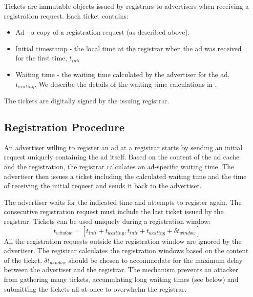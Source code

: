 Tickets are immutable objects issued by registrars to advertisers when receiving a registration request. Each ticket contains:
\begin{itemize}
    \item Ad - a copy of a registration request (as described above). 
    \item Initial timestamp - the local time at the registrar when the ad was received for the first time, $t_\textit{init}$
    \item Waiting time - the waiting time calculated by the advertiser for the ad, $t_\textit{waiting}$. We describe the details of the waiting time calculations in . 
\end{itemize}
The tickets are digitally signed by the issuing registrar. 

\subsection{Registration Procedure}
An advertiser willing to register an ad at a registrar starts by sending an
initial request uniquely containing the ad itself. Based on the
content of the ad cache and the registration, the registrar calculates an
ad-specific waiting time. The advertiser then issues a ticket including the
calculated waiting time and the time of receiving the initial request and sends it back to the advertiser.

The advertiser waits for the indicated time and attempts to register again. The consecutive registration request must include the last ticket issued by the registrar. Tickets can be used uniquely during a registration window:
\begin{equation}\label{eq:registration_window}
    t_\textit{window} = [t_\textit{init} + t_\textit{waiting}, t_\textit{init} + t_\textit{waiting} + \delta t_\textit{window}]
\end{equation}
All the registration requests outside the registration window are ignored by the advertiser. The registrar calculates the registration windows based on the content of the ticket. $\delta t_\textit{window}$ should be chosen to accommodate for the maximum delay between the advertiser and the registrar. The mechanism prevents an attacker from gathering many tickets, accumulating long waiting times (see below) and submitting the tickets all at once to overwhelm the registrar. 

